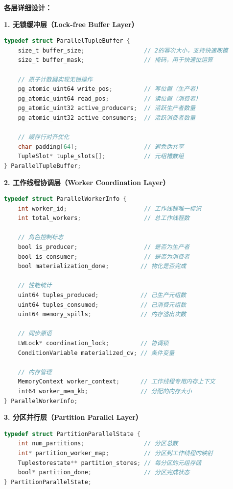 \textbf{各层详细设计：}

\textbf{1. 无锁缓冲层（Lock-free Buffer Layer）}
\begin{lstlisting}[language=C, caption=无锁环形缓冲区结构]
typedef struct ParallelTupleBuffer {
    size_t buffer_size;                 // 2的幂次大小，支持快速取模
    size_t buffer_mask;                 // 掩码，用于快速位运算
    
    // 原子计数器实现无锁操作
    pg_atomic_uint64 write_pos;         // 写位置（生产者）
    pg_atomic_uint64 read_pos;          // 读位置（消费者）
    pg_atomic_uint32 active_producers;  // 活跃生产者数量
    pg_atomic_uint32 active_consumers;  // 活跃消费者数量
    
    // 缓存行对齐优化
    char padding[64];                   // 避免伪共享
    TupleSlot* tuple_slots[];           // 元组槽数组
} ParallelTupleBuffer;
\end{lstlisting}

\textbf{2. 工作线程协调层（Worker Coordination Layer）}
\begin{lstlisting}[language=C, caption=工作线程信息结构]
typedef struct ParallelWorkerInfo {
    int worker_id;                      // 工作线程唯一标识
    int total_workers;                  // 总工作线程数
    
    // 角色控制标志
    bool is_producer;                   // 是否为生产者
    bool is_consumer;                   // 是否为消费者
    bool materialization_done;         // 物化是否完成
    
    // 性能统计
    uint64 tuples_produced;            // 已生产元组数
    uint64 tuples_consumed;            // 已消费元组数
    uint64 memory_spills;              // 内存溢出次数
    
    // 同步原语
    LWLock* coordination_lock;         // 协调锁
    ConditionVariable materialized_cv; // 条件变量
    
    // 内存管理
    MemoryContext worker_context;      // 工作线程专用内存上下文
    int64 worker_mem_kb;               // 分配的内存大小
} ParallelWorkerInfo;
\end{lstlisting}

\textbf{3. 分区并行层（Partition Parallel Layer）}
\begin{lstlisting}[language=C, caption=分区并行状态结构]
typedef struct PartitionParallelState {
    int num_partitions;                 // 分区总数
    int* partition_worker_map;          // 分区到工作线程的映射
    Tuplestorestate** partition_stores; // 每分区的元组存储
    bool* partition_done;               // 分区完成状态
} PartitionParallelState;
\end{lstlisting}

